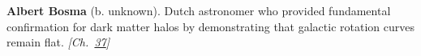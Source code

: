 \textbf{Albert Bosma} (b. unknown). Dutch astronomer who provided fundamental confirmation for dark matter halos by demonstrating that galactic rotation curves remain flat. \emph{[Ch.~\hyperref[ch:darkmatterevidence]{37}]}

